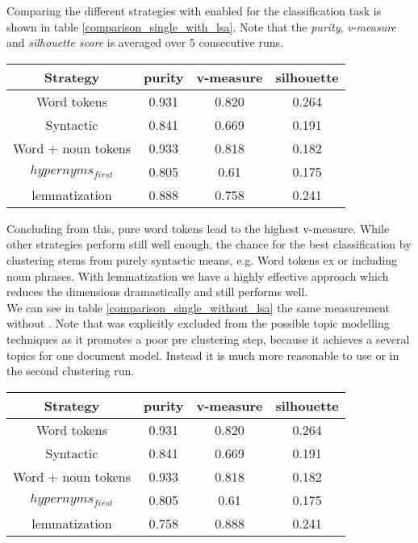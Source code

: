   Comparing the different strategies with \lsa{} enabled for the classification task is shown in table \ref{comparison_single_with_lsa}. Note that the \emph{purity}, \emph{v-measure} and \emph{silhouette score} is averaged over 5 consecutive runs.

    \begin{center}\label{comparison_single_with_lsa}
      \begin{tabular}{ c | c | c | c }
      Strategy    & purity  & v-measure & silhouette \\ \hline
      Word tokens & 0.931   & 0.820     & 0.264 \\
      Syntactic   & 0.841   & 0.669     & 0.191 \\
      Word + noun tokens & 0.933   & 0.818     & 0.182 \\
      \wordnet{} $hypernyms_{first}$ & 0.805   & 0.61     & 0.175 \\
      \wordnet{} lemmatization   & 0.888   & 0.758     & 0.241 \\
      \end{tabular}
    \end{center}

  Concluding from this, pure word tokens lead to the highest v-measure. While other strategies perform still well enough, the chance for the best classification by clustering stems from purely syntactic means, e.g. Word tokens ex or including noun phrases. With \wordnet{} lemmatization we have a highly effective approach which reduces the dimensions dramastically and still performs well.\\
  We can see in table \ref{comparison_single_without_lsa} the same measurement without \lsa{}. Note that \lda{} was explicitly excluded from the possible topic modelling techniques as it promotes a poor pre clustering step, because it achieves a several topics for one document model. Instead it is much more reasonable to use \lda{} or \hdp{} in the second clustering run.

    \begin{center}\label{comparison_single_without_lsa}
      \begin{tabular}{ c | c | c | c }
      Strategy    & purity  & v-measure & silhouette \\ \hline
      Word tokens & 0.931   & 0.820     & 0.264 \\
      Syntactic   & 0.841   & 0.669     & 0.191 \\
      Word + noun tokens & 0.933   & 0.818     & 0.182 \\
      \wordnet{} $hypernyms_{first}$ & 0.805   & 0.61     & 0.175 \\
      \wordnet{} lemmatization   & 0.758   & 0.888     & 0.241 \\
      \end{tabular}
    \end{center}

